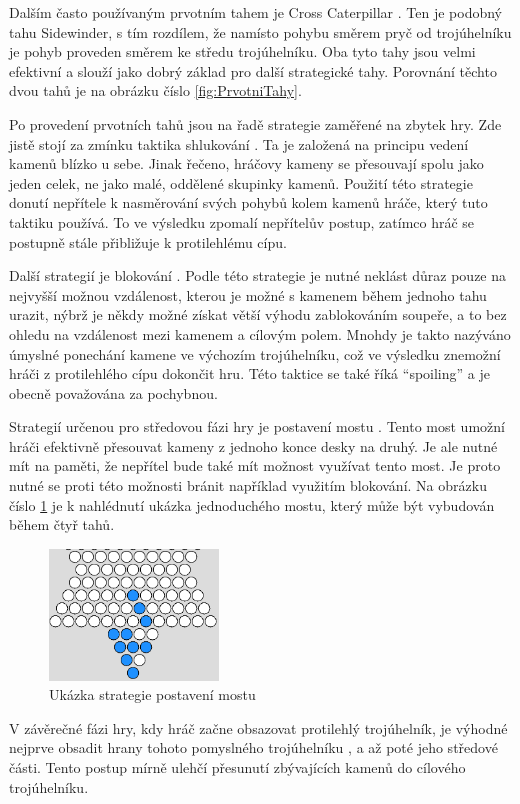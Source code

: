 Dalším často používaným prvotním tahem je Cross Caterpillar \cite{strategie}. Ten je podobný tahu Sidewinder, s tím rozdílem, že namísto pohybu směrem pryč od trojúhelníku je pohyb proveden směrem ke středu trojúhelníku. Oba tyto tahy jsou velmi efektivní a slouží jako dobrý základ pro další strategické tahy. Porovnání těchto dvou tahů je na obrázku číslo \ref{fig:PrvotniTahy}.

Po provedení prvotních tahů jsou na řadě strategie zaměřené na zbytek hry. Zde jistě stojí za zmínku taktika shlukování \cite{strategie}. Ta je založená na principu vedení kamenů blízko u sebe. Jinak řečeno, hráčovy kameny se přesouvají spolu jako jeden celek, ne jako malé, oddělené skupinky kamenů. Použití této strategie donutí nepřítele k nasměrování svých pohybů kolem kamenů hráče, který tuto taktiku používá. To ve výsledku zpomalí nepřítelův postup, zatímco hráč se postupně stále přibližuje k protilehlému cípu.

Další strategií je blokování \cite{strategie2}. Podle této strategie je nutné neklást důraz pouze na nejvyšší možnou vzdálenost, kterou je možné s kamenem během jednoho tahu urazit, nýbrž je někdy možné získat větší výhodu zablokováním soupeře, a to bez ohledu na vzdálenost mezi kamenem a cílovým polem. Mnohdy je takto nazýváno úmyslné ponechání kamene ve výchozím trojúhelníku, což ve výsledku znemožní hráči z protilehlého cípu dokončit hru. Této taktice se také říká \enquote{spoiling} a je obecně považována za pochybnou.

Strategií určenou pro středovou fázi hry je postavení mostu \cite{strategie}. Tento most umožní hráči efektivně přesouvat kameny z jednoho konce desky na druhý. Je ale nutné mít na paměti, že nepřítel bude také mít možnost využívat tento most. Je proto nutné se proti této možnosti bránit například využitím blokování. Na obrázku číslo \ref{fig:Most} je k nahlédnutí ukázka jednoduchého mostu, který může být vybudován během čtyř tahů.

\begin{figure}
	\centering
	\includegraphics[width=0.4\textwidth]{Figures/Most.png}
	\caption{Ukázka strategie postavení mostu}
    \label{fig:Most}
\end{figure}

V závěrečné fázi hry, kdy hráč začne obsazovat protilehlý trojúhelník, je výhodné nejprve obsadit hrany tohoto pomyslného trojúhelníku \cite{strategie2}, a až poté jeho středové části. Tento postup mírně ulehčí přesunutí zbývajících kamenů do cílového trojúhelníku.
\endinput